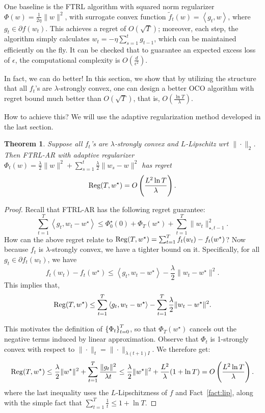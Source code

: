 \documentclass{article}
\newtheorem{theorem}{Theorem}
\DeclareMathOperator*{\Reg}{{\rm Reg}}
\newcommand{\inner}[2]{\left\langle #1,#2 \right\rangle}
\begin{document}
One baseline is the FTRL algorithm with squared norm regularizer $\Phi(w) = \frac{1}{2\eta}\|w\|^2$, with surrogate convex function $\tilde{f}_t(w) = \inner{g_t}{w}$, where $g_t \in \partial f(w_t)$. This achieves a regret of $O(\sqrt{T})$; moreover, each step, the algorithm simply calculates $w_t = - \eta \sum_{s=1}^t g_{t-1}$, which can be maintained efficiently on the fly. It can be checked that to guarantee an expected excess loss of $\epsilon$, the computational complexity is $O(\frac{d}{\epsilon^2})$.

In fact, we can do better! In this section, we show that by utilizing the structure that all $f_t$'s are $\lambda$-strongly convex, one can design a better OCO algorithm with regret bound much better than $O(\sqrt{T})$, that is, $O(\frac{\ln T}{\lambda})$.

How to achieve this? We will use the adaptive regularization method developed in the last section.
\begin{theorem}
Suppose all $f_t$'s are $\lambda$-strongly convex and $L$-Lipschitz wrt $\| \cdot \|_2$. Then FTRL-AR with adaptive regularizer $\Phi_t(w) = \frac\lambda 2\| w \|^2 + \sum_{s=1}^t \frac\lambda 2\| w_s - w \|^2$ has regret
\[ \Reg(T, w^\star) = O\del{\frac{L^2 \ln T}{\lambda}}. \]
\label{thm:log-ftrl-ar}
\end{theorem}
\begin{proof}
Recall that FTRL-AR has the following regret guarantee:
\[ \sum_{t=1}^T \inner{g_t}{w_t - w^\star} \leq \Phi_0^\star(0) + \Phi_T(w^\star) + \sum_{t=1}^T \| w_t \|_{\star, t-1}^2. \]
How can the above regret relate to $\Reg(T, w^\star) = \sum_{t=1}^T f_t(w_t) - f_t(w^\star)$? Now because $f_t$ is $\lambda$-strongly convex, we have a tighter bound on it. Specifically, for all $g_t \in \partial f_t(w_t)$, we have
\[ f_t(w_t) - f_t(w^\star) \leq \inner{g_t}{w_t - w^\star} - \frac\lambda 2\| w_t - w^\star \|^2. \]
This implies that,
\[ \Reg(T, w^\star) \leq \sum_{t=1}^T \inner{g_t}{w_t - w^\star} - \sum_{t=1}^T \frac\lambda 2\| w_t - w^\star \|^2. \]

This motivates the definition of $\cbr{\Phi_t}_{t=0}^T$, so that $\Phi_T(w^\star)$ cancels out the negative terms induced by linear approximation.
Observe that $\Phi_t$ is 1-strongly convex with respect to $\| \cdot \|_t = \| \cdot \|_{\lambda(t+1) I}$.
We therefore get:
\[ \Reg(T, w^\star) \leq \frac{\lambda}{2}\|w^\star\|^2 + \sum_{t=1}^T \frac{\| g_t \|^2}{\lambda t} \leq \frac{\lambda}{2}\|w^\star\|^2 + \frac{L^2}{\lambda}(1 + \ln T) = O\del{\frac{L^2 \ln T}{\lambda}}. \]
where the last inequality uses the $L$-Lipschitzness of $f$ and Fact~\ref{fact:lip}, along with the simple fact that $\sum_{t=1}^T \frac1t \leq 1 + \ln T$.
\end{proof}
\end{document}
